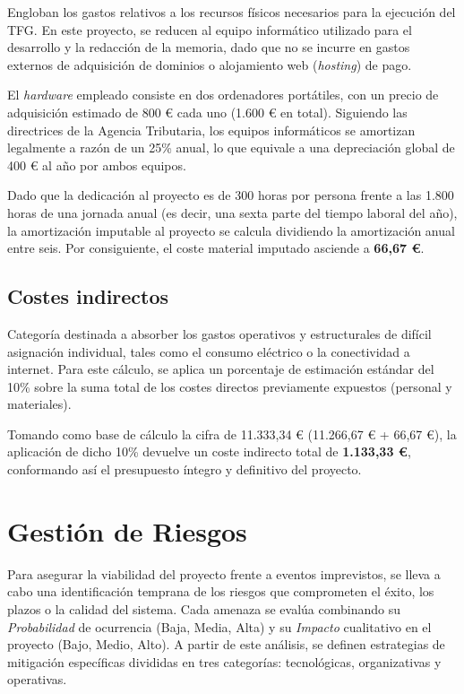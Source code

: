 Engloban los gastos relativos a los recursos físicos necesarios para la ejecución del TFG. En este proyecto, se reducen al equipo informático utilizado para el desarrollo y la redacción de la memoria, dado que no se incurre en gastos externos de adquisición de dominios o alojamiento web (\textit{hosting}) de pago.

El \textit{hardware} empleado consiste en dos ordenadores portátiles, con un precio de adquisición estimado de 800 \euro{} cada uno (1.600 \euro{} en total). Siguiendo las directrices de la Agencia Tributaria, los equipos informáticos se amortizan legalmente a razón de un 25\% anual, lo que equivale a una depreciación global de 400 \euro{} al año por ambos equipos.

Dado que la dedicación al proyecto es de 300 horas por persona frente a las 1.800 horas de una jornada anual (es decir, una sexta parte del tiempo laboral del año), la amortización imputable al proyecto se calcula dividiendo la amortización anual entre seis. Por consiguiente, el coste material imputado asciende a \textbf{66,67 \euro}.

\subsection{Costes indirectos}

Categoría destinada a absorber los gastos operativos y estructurales de difícil asignación individual, tales como el consumo eléctrico o la conectividad a internet. Para este cálculo, se aplica un porcentaje de estimación estándar del 10\% sobre la suma total de los costes directos previamente expuestos (personal y materiales).

Tomando como base de cálculo la cifra de 11.333,34 \euro{} (11.266,67 \euro{} + 66,67 \euro), la aplicación de dicho 10\% devuelve un coste indirecto total de \textbf{1.133,33 \euro}, conformando así el presupuesto íntegro y definitivo del proyecto.

\section{Gestión de Riesgos}

Para asegurar la viabilidad del proyecto frente a eventos imprevistos, se lleva a cabo una identificación temprana de los riesgos que comprometen el éxito, los plazos o la calidad del sistema. Cada amenaza se evalúa combinando su \textit{Probabilidad} de ocurrencia (Baja, Media, Alta) y su \textit{Impacto} cualitativo en el proyecto (Bajo, Medio, Alto). A partir de este análisis, se definen estrategias de mitigación específicas divididas en tres categorías: tecnológicas, organizativas y operativas.


